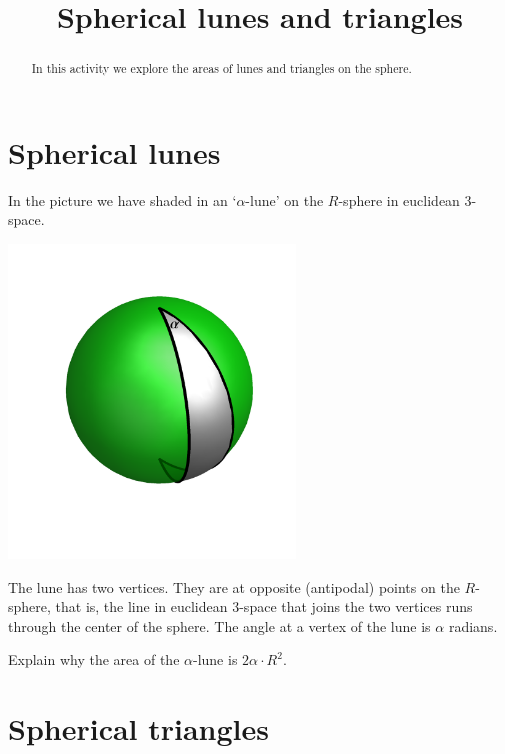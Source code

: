 \documentclass{ximera}
\title{Spherical lunes and triangles}
\begin{document}
\begin{abstract}
In this activity we explore the areas of lunes and triangles on the sphere.
\end{abstract}
\maketitle



\section{Spherical lunes}

In the picture we have shaded in an `$\alpha$-lune' on the $R$-sphere in
euclidean $3$-space.%
\begin{image}
\includegraphics[width=3in]{W13_3.png}%
\end{image}


The lune has two vertices. They are at opposite (antipodal) points on the
$R$-sphere, that is, the line in euclidean $3$-space that joins the two
vertices runs through the center of the sphere. The angle at a vertex of the
lune is $\alpha$ radians.

\begin{problem}
\label{67} Explain why the area of the $\alpha$-lune is $2\alpha
\cdot R^{2}$.
\end{problem}


\section{Spherical triangles}
\end{document}
